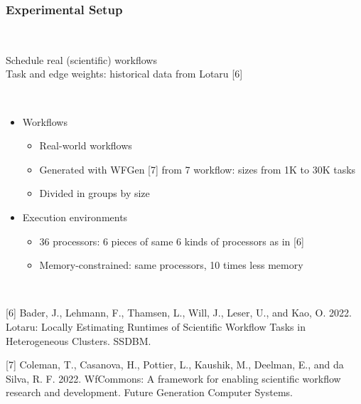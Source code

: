 \documentclass[xcolor=svgnames,titlepage,english,presentation]{beamer}
\begin{document}
\begin{frame}[t]
    \frametitle{Experimental Setup}

    ~~~~~~~~~~~~~~~~~~~~~~~

    Schedule real (scientific) workflows \\[0.35ex]
    
    Task and edge weights: historical data from Lotaru [6]

    ~~~~~~~~~~~~~~~~~~~

        \begin{itemize}  
        \item Workflows
        \begin{itemize}
             \item Real-world workflows
            \item Generated with WFGen [7] from 7 workflow: sizes from 1K to 30K tasks
            \item Divided in groups by size
        \end{itemize}          
     
        \item Execution environments
         \begin{itemize}
             \item 36 processors: 6 pieces of same 6 kinds of processors as in [6]
            \item Memory-constrained: same processors, 10 times less memory
        \end{itemize} 
    \end{itemize}    

~~~~~~~~~~~~~~~~~~~~~~~~


\footnotesize{[6] Bader, J., Lehmann, F., Thamsen, L., Will, J., Leser, U., and Kao, O. 2022. Lotaru: Locally Estimating Runtimes of Scientific Workflow Tasks in Heterogeneous Clusters. SSDBM.}

\footnotesize{[7] Coleman, T., Casanova, H., Pottier, L., Kaushik, M., Deelman, E., and da Silva, R. F. 2022. WfCommons: A framework for enabling scientific
workflow research and development. Future Generation Computer Systems.}

\end{frame}
\end{document}
